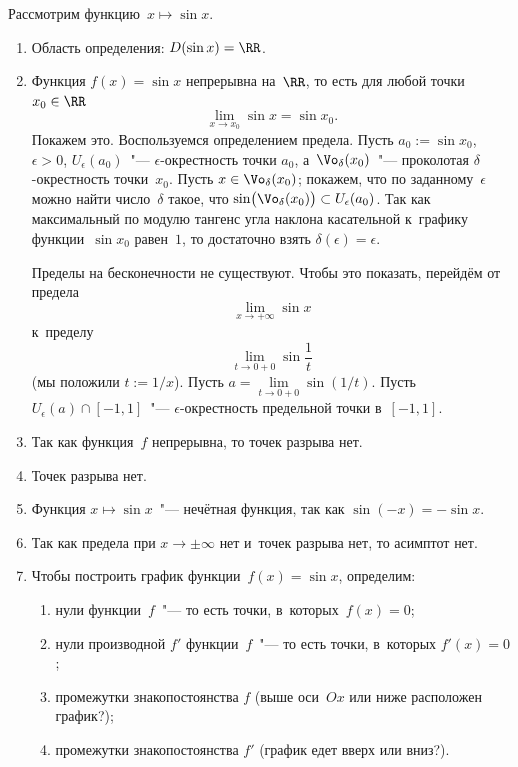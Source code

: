 \begin{solution}
	Рассмотрим функцию~$x \mapsto \sin{x}$.
	\begin{enumerate}[1.]
		\item Область определения: $D(\sin{x}) = \RR$.
		\item Функция $f(x) = \sin{x}$ непрерывна на~$\RR$, то есть для любой
			точки~$x_0 \in \RR$
			\[
				\lim_{x \to x_0} \sin{x} = \sin{x_0}.
			\]
			Покажем это. Воспользуемся определением предела. Пусть $a_0 :=
			\sin{x_0}$, $\epsilon > 0$, $U_{\epsilon}(a_0)$~"---
			$\epsilon$-окрестность точки $a_0$, а~$\Vo_{\delta}(x_0)$~"--- проколотая
			$\delta$-окрестность точки~$x_0$.  Пусть $x \in \Vo_\delta(x_0)$;
			покажем, что по заданному~$\epsilon$ можно найти число~$\delta$ такое,
			что $\sin \bigl( \Vo_\delta(x_0) \bigr) \subset U_\epsilon (a_0)$. Так
			как максимальный по модулю тангенс угла наклона касательной к~графику
			функции~$\sin{x_0}$ равен~$1$, то достаточно взять $\delta(\epsilon) =
			\epsilon$.

			Пределы на бесконечности не существуют. Чтобы это показать, перейдём от
			предела
			\[
				\lim_{x \to +\infty} {\sin{x}}
			\]
			к~пределу
			\[
				\lim_{t \to 0 + 0}{\sin{\frac{1}{t}}}
			\]
			(мы положили $t := 1/x$).
			Пусть $a = \lim\limits_{t \to 0 + 0} \sin(1/t)$. Пусть $U_\epsilon(a)
			\cap [-1, 1]$~"--- $\epsilon$-окрестность предельной точки в~$[-1, 1]$.

		\item Так как функция~$f$ непрерывна, то точек разрыва нет.

		\item Точек разрыва нет.

		\item Функция $x \mapsto \sin{x}$~"--- нечётная функция, так как $\sin(-x) =
			-\sin{x}$.

		\item Так как предела при $x \to \pm \infty$ нет и~точек разрыва нет, то
			асимптот нет.

		\item Чтобы построить график функции~$f(x) = \sin{x}$, определим:
			\begin{enumerate}[1)]
				\item нули функции~$f$~"--- то есть точки, в~которых~$f(x) = 0$;
				\item нули производной $f'$ функции~$f$~"--- то есть точки, в~которых
					$f'(x) = 0$;
				\item промежутки знакопостоянства $f$ (выше оси~$Ox$ или ниже
					расположен график?);
				\item промежутки знакопостоянства $f'$ (график едет вверх или вниз?).
			\end{enumerate}


\end{enumerate}
\end{solution}
